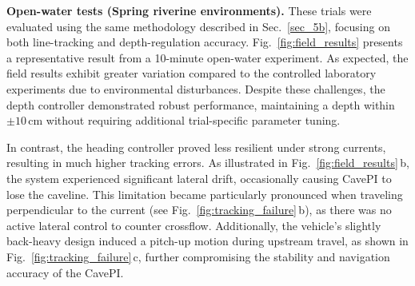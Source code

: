 \vspace{1mm}
\noindent
\textbf{Open-water tests (Spring riverine environments).} These trials were evaluated using the same methodology described in Sec.~\ref{sec_5b}, focusing on both line-tracking and depth-regulation accuracy. Fig.~\ref{fig:field_results} presents a representative result from a 10-minute open-water experiment. As expected, the field results exhibit greater variation compared to the controlled laboratory experiments due to environmental disturbances. Despite these challenges, the depth controller demonstrated robust performance, maintaining a depth within $\pm 10$\,cm without requiring additional trial-specific parameter tuning.

In contrast, the heading controller proved less resilient under strong currents, resulting in much higher tracking errors. As illustrated in Fig.~\ref{fig:field_results}\,b, the system experienced significant lateral drift, occasionally causing CavePI to lose the caveline. This limitation became particularly pronounced when traveling perpendicular to the current (see Fig.~\ref{fig:tracking_failure}\,b), as there was no active lateral control to counter crossflow. Additionally, the vehicle’s slightly back-heavy design induced a pitch-up motion during upstream travel, as shown in Fig.~\ref{fig:tracking_failure}\,c, further compromising the stability and navigation accuracy of the CavePI. %







